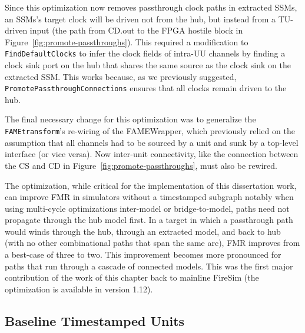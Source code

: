 
Since this optimization now removes passthrough clock paths in extracted SSMs,
an SSMs's target clock will be driven not from the hub, but instead from a TU-driven
input (the path from CD.out to the FPGA hostile block in
Figure~\ref{fig:promote-passthroughs}). This required a modification to
\texttt{FindDefaultClocks} to infer the clock fields of intra-UU channels by
finding a clock sink port on the hub that shares the same source as the clock
sink on the extracted SSM. This works because, as we previously suggested,
\texttt{PromotePassthroughConnections} ensures that all clocks remain driven to
the hub.

The final necessary change for this optimization was to generalize the
\texttt{FAMEtransform}'s re-wiring of the FAMEWrapper, which previously relied
on the assumption that all channels had to be sourced by a unit and sunk by a
top-level interface (or vice versa). Now inter-unit connectivity, like the
connection between the CS and CD in Figure~\ref{fig:promote-passthroughs}, must
also be rewired.

The optimization, while critical for the implementation of this dissertation
work, can improve FMR in simulators without a timestamped subgraph notably when
using multi-cycle optimizations inter-model or bridge-to-model, paths need not
propagate through the hub model first. In a target in which a passthrough path
would winds through the hub, through an extracted model, and back to hub (with
no other combinational paths that span the same arc), FMR improves from a
best-case of three to two. This improvement becomes more pronounced for paths
that run through a cascade of connected models. This was the first major
contribution of the work of this chapter back to mainline FireSim (the
optimization is available in version 1.12).

\subsection{Baseline Timestamped Units}\label{sec:pdes-baseline-units}

